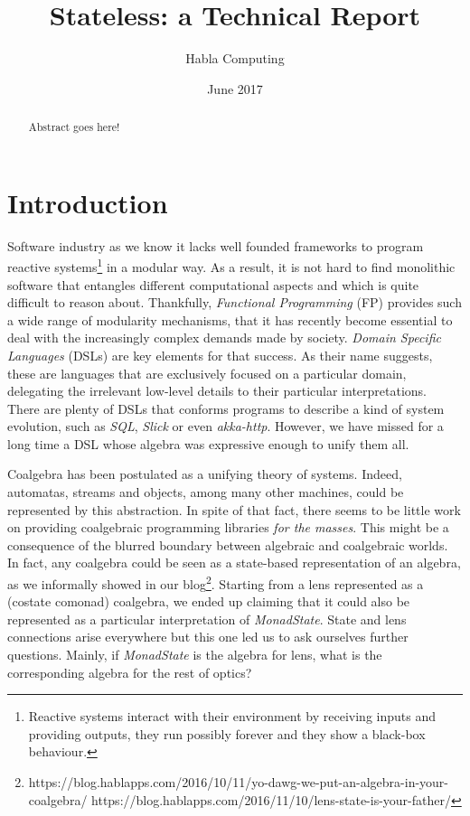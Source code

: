 \documentclass[a4paper]{report}
\begin{document}
\title{Stateless: a Technical Report}
\author{Habla Computing}
\date{June 2017}

\maketitle

\begin{abstract}

  Abstract goes here!

\end{abstract}

\tableofcontents

\chapter{Introduction}

Software industry as we know it lacks well founded frameworks to program
reactive systems\footnote{Reactive systems interact with their environment by
receiving inputs and providing outputs, they run possibly forever and they show
a black-box behaviour.} in a modular way. As a result, it is not hard to find
monolithic software that entangles different computational aspects and which is
quite difficult to reason about. Thankfully, \emph{Functional Programming} (FP)
provides such a wide range of modularity mechanisms, that it has recently become
essential to deal with the increasingly complex demands made by society.
\emph{Domain Specific Languages} (DSLs) are key elements for that success. As
their name suggests, these are languages that are exclusively focused on a
particular domain, delegating the irrelevant low-level details to their
particular interpretations. There are plenty of DSLs that conforms programs to
describe a kind of system evolution, such as \emph{SQL}, \emph{Slick} or even
\emph{akka-http}. However, we have missed for a long time a DSL whose algebra
was expressive enough to unify them all.

Coalgebra has been postulated as a unifying theory of systems. Indeed,
automatas, streams and objects, among many other machines, could be represented
by this abstraction. In spite of that fact, there seems to be little work on
providing coalgebraic programming libraries \emph{for the masses}. This might be
a consequence of the blurred boundary between algebraic and coalgebraic worlds.
In fact, any coalgebra could be seen as a state-based representation of an
algebra, as we informally showed in our blog\footnote{
https://blog.hablapps.com/2016/10/11/yo-dawg-we-put-an-algebra-in-your-coalgebra/
https://blog.hablapps.com/2016/11/10/lens-state-is-your-father/}. Starting from
a lens represented as a (costate comonad) coalgebra, we ended up claiming that
it could also be represented as a particular interpretation of
\emph{MonadState}. State and lens connections arise everywhere but this one led
us to ask ourselves further questions. Mainly, if \emph{MonadState} is the
algebra for lens, what is the corresponding algebra for the rest of optics?
\end{document}
